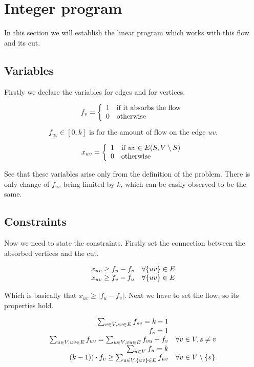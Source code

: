 \documentclass{article}
\theoremstyle{plain}
\theoremstyle{plain}
\theoremstyle{remark}
\begin{document}
	
	\section{Integer program}
	
	In this section we will establish the linear program which works with this flow and its cut.
	
	\subsection{Variables}
	
	Firstly we declare the variables for edges and for vertices.
	
	$$
	f_v = \left\{\begin{array}{l l}
		1 & \text{if it absorbs the flow} \\
		0 & \text{otherwise}
	\end{array}
	\right.
	$$
	
	$$
	f_{uv} \in [0,k] \text{ is for the amount of flow on the edge } uv.
	$$
	
	$$
	x_{uv} = \left\{\begin{array}{l l}
		1 & \text{if } uv \in E(S, V \setminus S)\\
		0 & \text{otherwise}
	\end{array}
	\right.
	$$
	
	See that these variables arise only from the definition of the problem. There is only change of $f_{uv}$ being limited by $k$, which can be easily observed to be the same.
	
	\subsection{Constraints}
	
	Now we need to state the constraints. Firstly set the connection between the absorbed vertices and the cut.
	
	$$
	\begin{array}{r l}
		x_{uv} \geq f_u - f_v & \forall \{uv\} \in E\\
		x_{uv} \geq f_v - f_u & \forall \{uv\} \in E
	\end{array}
	$$
	
	Which is basically that $x_{uv} \geq |f_u - f_v|$. Next we have to set the flow, so its properties hold.
	
	$$
	\begin{array}{r l}
		\sum_{v \in V, sv \in E} f_{sv} = k-1 \\
		f_s = 1 \\
		\sum_{u \in V, uv \in E} f_{uv} = \sum_{u \in V, vu \in E} f_{vu} + f_v & \forall v \in V, s \neq v \\
		\sum_{u \in V} f_u = k \\
		(k-1)) \cdot f_{v} \geq \sum_{u \in V, \{uv\} \in E} f_{uv} & \forall v \in V \setminus \{s\}
	\end{array}
	$$
	
\end{document}
